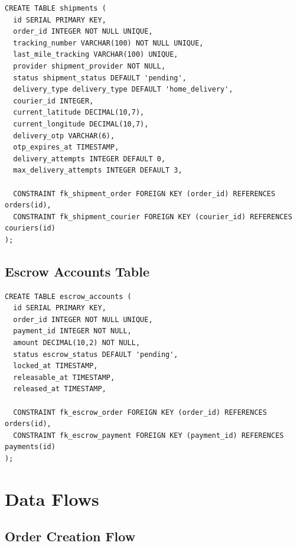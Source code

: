 \documentclass[12pt,a4paper]{report}
\begin{document}
\begin{lstlisting}[caption=Shipments Table DDL with Last-Mile Tracking]
CREATE TABLE shipments (
  id SERIAL PRIMARY KEY,
  order_id INTEGER NOT NULL UNIQUE,
  tracking_number VARCHAR(100) NOT NULL UNIQUE,
  last_mile_tracking VARCHAR(100) UNIQUE,
  provider shipment_provider NOT NULL,
  status shipment_status DEFAULT 'pending',
  delivery_type delivery_type DEFAULT 'home_delivery',
  courier_id INTEGER,
  current_latitude DECIMAL(10,7),
  current_longitude DECIMAL(10,7),
  delivery_otp VARCHAR(6),
  otp_expires_at TIMESTAMP,
  delivery_attempts INTEGER DEFAULT 0,
  max_delivery_attempts INTEGER DEFAULT 3,
  
  CONSTRAINT fk_shipment_order FOREIGN KEY (order_id) REFERENCES orders(id),
  CONSTRAINT fk_shipment_courier FOREIGN KEY (courier_id) REFERENCES couriers(id)
);
\end{lstlisting}

\section{Escrow Accounts Table}

\begin{lstlisting}[caption=Escrow Accounts Table DDL]
CREATE TABLE escrow_accounts (
  id SERIAL PRIMARY KEY,
  order_id INTEGER NOT NULL UNIQUE,
  payment_id INTEGER NOT NULL,
  amount DECIMAL(10,2) NOT NULL,
  status escrow_status DEFAULT 'pending',
  locked_at TIMESTAMP,
  releasable_at TIMESTAMP,
  released_at TIMESTAMP,
  
  CONSTRAINT fk_escrow_order FOREIGN KEY (order_id) REFERENCES orders(id),
  CONSTRAINT fk_escrow_payment FOREIGN KEY (payment_id) REFERENCES payments(id)
);
\end{lstlisting}

\chapter{Data Flows}

\section{Order Creation Flow}
\end{document}
